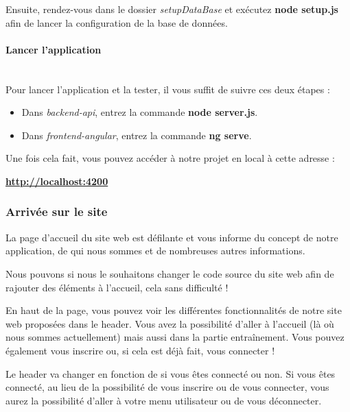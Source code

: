 \documentclass[12pt,french]{article}
\begin{document}
\bigskip

Ensuite, rendez-vous dans le dossier \textit{setupDataBase} et exécutez \textbf{node setup.js} afin de lancer la configuration de la base de données.

\paragraph{Lancer l'application \\\\}

Pour lancer l'application et la tester, il vous suffit de suivre ces deux étapes :

\begin{itemize}
	\item Dans \textit{backend-api}, entrez la commande \textbf{node server.js}.
	\item Dans \textit{frontend-angular}, entrez la commande \textbf{ng serve}.
\end{itemize}

Une fois cela fait, vous pouvez accéder à notre projet en local à cette adresse :

\textbf{\href{http://localhost:4200}{http://localhost:4200}}

\subsubsection{Arrivée sur le site}

La page d'accueil du site web est défilante et vous informe du concept de notre application, de qui nous sommes et de nombreuses autres informations.

Nous pouvons si nous le souhaitons changer le code source du site web afin de rajouter des éléments à l'accueil, cela sans difficulté !

\bigskip

En haut de la page, vous pouvez voir les différentes fonctionnalités de notre site web proposées dans le \gls{header}. Vous avez la possibilité d'aller à l'accueil (là où nous sommes actuellement) mais aussi dans la partie entraînement. Vous pouvez également vous inscrire ou, si cela est déjà fait, vous connecter !

Le \gls{header} va changer en fonction de si vous êtes connecté ou non. Si vous êtes connecté, au lieu de la possibilité de vous inscrire ou de vous connecter, vous aurez la possibilité d'aller à votre menu utilisateur ou de vous déconnecter.
\end{document}
